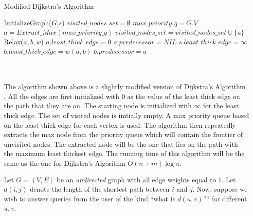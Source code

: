 \documentclass[addpoints]{exam}
\begin{document}
\begin{questions}
\begin{minipage}{\linewidth}
  \begin{algorithm}[H]
    \caption{Modified Dijkstra's Algorithm}\label{Djk}
    \begin{algorithmic}[1]
      	\State InitializeGraph($G$,$s$)
	\State $visited\_nodes\_set =\emptyset$
	\State $max\_priority\_q = G.V$ 
		\State $a=Extract\_Max(max\_priority\_q)$
		\State $visited\_nodes\_set =  visited\_nodes\_set \cup \{a\}$
			\State Relax($a, b, w$)
		\EndFor
	\EndWhile
      \EndProcedure    
		\State $a.least\_thick\_edge = 0$
		\State $a.predecessor = NIL$
	\EndFor
	\State $s.least\_thick\_edge =\infty$
      \EndProcedure
		\State $b.least\_thick\_edge = w(a,b)$
		\State $b.predecessor = a$
	\EndIf
      \EndProcedure    
     \end{algorithmic}
  \end{algorithm}
\end{minipage}\\\\

The algorithm shown above is a slightly modified version of Dijkstra's Algorithm \cite{CLRS}. All the edges are first initialized with $0$ as the value of the least thick edge on the path that they are on. The starting node is initialized with $\infty$ for the least thick edge. The set of visited nodes is initially empty. A max priority queue based on the least thick edge for each vertex is used. The algorithm then repeatedly extracts the max node from the priority queue which will contain the frontier of unvisited nodes. The extracted node will be the one that lies on the path with the maximum least thickest edge. The running time of this algorithm will be the same \cite{CLRS} as the one for Dijkstra's Algorithm $O(n+m)\log n$.


Let $G = (V, E)$ be an {\em undirected} graph with all edge weights equal to $1$. Let $d(i,j)$ denote the length of the shortest path between $i$ and $j$.  Now, suppose we wish to answer queries from the user of the kind ``what is $d(u, v)$''? for different $u, v$.


\end{questions}
\end{document}
